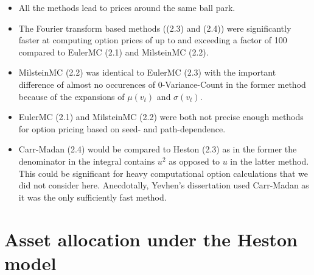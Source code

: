 \documentclass[11pt]{article}
\numberwithin{equation}{section}
\begin{document}
\begin{itemize}
    \item All the methods lead to prices around the same ball park.
    \item The Fourier transform based methods ((2.3) and (2.4)) were
    significantly faster at computing option prices of up to and exceeding a
    factor of 100 compared to EulerMC (2.1) and MilsteinMC (2.2).
    \item MilsteinMC (2.2) was identical to EulerMC (2.3) with the important
    difference of almost no occurences of 0-Variance-Count in the former method
    because of the expansions of $\mu(v_t)$ and $\sigma(v_t)$.
    \item EulerMC (2.1) and MilsteinMC (2.2) were both not precise enough
    methods for option pricing based on seed- and path-dependence.
    \item Carr-Madan (2.4) would be compared to Heston (2.3) as in the former
    the denominator in the integral contains $u^2$ as opposed to
    $u$ in the latter method. This could be significant for heavy computational option calculations
    that we did not consider here. Anecdotally, Yevhen's dissertation used
    Carr-Madan as it was the only sufficiently fast method.
\end{itemize}

\newpage
\section{Asset allocation under the Heston model}
\end{document}
